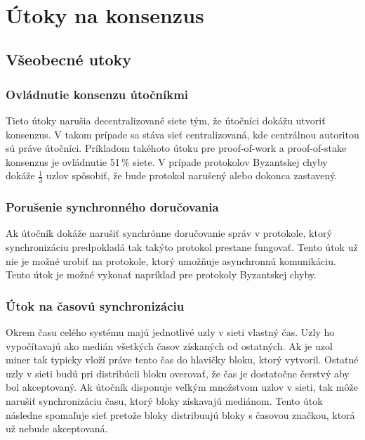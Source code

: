 ~\cite{narayanan2016bitcoin}

\chapter{Útoky na konsenzus}

\section{Všeobecné utoky}

\subsection{Ovládnutie konsenzu útočníkmi}
Tieto útoky narušia decentralizované siete tým, že útočníci dokážu utvoriť konsenzus. V takom prípade sa stáva sieť centralizovaná, kde centrálnou autoritou sú práve útočníci. Príkladom takéhoto útoku pre proof-of-work a proof-of-stake konsenzus je ovládnutie 51\,\% siete. V prípade protokolov Byzantskej chyby dokáže $\frac{1}{3}$ uzlov spôsobiť, že bude protokol narušený alebo dokonca zastavený.~\cite{homoliakBlockchain}

\subsection{Porušenie synchronného doručovania}

Ak útočník dokáže narušiť synchrónne doručovanie správ v protokole, ktorý synchronizáciu predpokladá tak takýto protokol prestane fungovať. Tento útok už nie je možné urobiť na protokole, ktorý umožňuje asynchronnú komunikáciu. Tento útok je možné vykonať napríklad pre protokoly Byzantskej chyby.~\cite{homoliakBlockchain}

\subsection{Útok na časovú synchronizáciu}
Okrem času celého systému majú jednotlivé uzly v sieti vlastný čas. Uzly ho vypočítavajú ako medián všetkých časov získaných od ostatných. Ak je uzol miner tak typicky vloží práve tento čas do hlavičky bloku, ktorý vytvoril. Ostatné uzly v sieti budú pri distribúcii bloku overovať, že čas je dostatočne čerstvý aby bol akceptovaný. Ak útočník disponuje veľkým množstvom uzlov v sieti, tak môže narušiť synchronizáciu času, ktorý bloky získavajú mediánom. Tento útok následne spomaľuje sieť pretože bloky distribuujú bloky s časovou značkou, ktorá už nebude akceptovaná.

